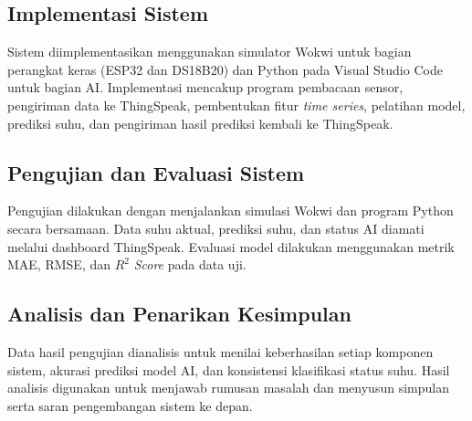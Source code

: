 \subsection{Implementasi Sistem}
Sistem diimplementasikan menggunakan simulator Wokwi untuk bagian perangkat
keras (ESP32 dan DS18B20) dan Python pada Visual Studio Code untuk bagian AI.
Implementasi mencakup program pembacaan sensor, pengiriman data ke ThingSpeak,
pembentukan fitur \textit{time series}, pelatihan model, prediksi suhu, dan
pengiriman hasil prediksi kembali ke ThingSpeak.

\subsection{Pengujian dan Evaluasi Sistem}
Pengujian dilakukan dengan menjalankan simulasi Wokwi dan program Python secara
bersamaan. Data suhu aktual, prediksi suhu, dan status AI diamati melalui
dashboard ThingSpeak. Evaluasi model dilakukan menggunakan metrik MAE, RMSE,
dan $R^2$ \textit{Score} pada data uji.

\subsection{Analisis dan Penarikan Kesimpulan}
Data hasil pengujian dianalisis untuk menilai keberhasilan setiap komponen
sistem, akurasi prediksi model AI, dan konsistensi klasifikasi status suhu.
Hasil analisis digunakan untuk menjawab rumusan masalah dan menyusun simpulan
serta saran pengembangan sistem ke depan.

